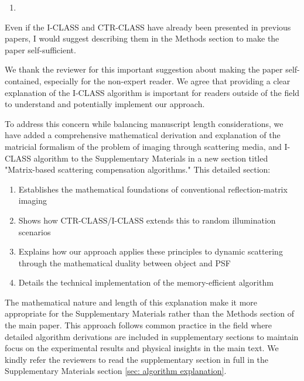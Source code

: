 \documentclass[12pt]{article}
\newenvironment{solved_reviewercomment}
    {\begin{tcolorbox}[width=\linewidth,colback=gray!5,colframe=solved_commentcolor!50,title=Reviewer Comment,left=5pt,right=5pt]}
    {\end{tcolorbox}}
\newenvironment{finished_ourresponse}
    {\begin{tcolorbox}[width=\linewidth,breakable,enhanced,colback=gray!5,colframe=finished_responsecolor!50,title=Response,left=5pt,right=5pt]}
    {\end{tcolorbox}}
\begin{document}
    
\begin{enumerate}[label=\arabic*., resume]
\item \leavevmode
\end{enumerate}
\vspace{-1em}
\begin{solved_reviewercomment}
    Even if the I-CLASS and CTR-CLASS have already been presented in previous papers, I would suggest describing them in the Methods section to make the paper self-sufficient. 
\end{solved_reviewercomment}

\begin{finished_ourresponse}
We thank the reviewer for this important suggestion about making the paper self-contained, especially for the non-expert reader. We agree that providing a clear explanation of the I-CLASS algorithm is important for readers outside of the field to understand and potentially implement our approach.

To address this concern while balancing manuscript length considerations, we have added a comprehensive mathematical derivation and explanation of the matricial formalism of the problem of imaging through scattering media, and I-CLASS algorithm to the Supplementary Materials in a new section titled "Matrix-based scattering compensation algorithms." This detailed section:

\begin{enumerate}
    \item Establishes the mathematical foundations of conventional reflection-matrix imaging
    \item Shows how CTR-CLASS/I-CLASS extends this to random illumination scenarios
    \item Explains how our approach applies these principles to dynamic scattering through the mathematical duality between object and PSF
    \item Details the technical implementation of the memory-efficient algorithm
    \end{enumerate}

The mathematical nature and length of this explanation make it more appropriate for the Supplementary Materials rather than the Methods section of the main paper. This approach follows common practice in the field where detailed algorithm derivations are included in supplementary sections to maintain focus on the experimental results and physical insights in the main text.
We kindly refer the reviewers to read the supplementary section in full in the Supplementary Materials section \ref{sec: algorithm explanation}.

\end{finished_ourresponse}
\end{document}
